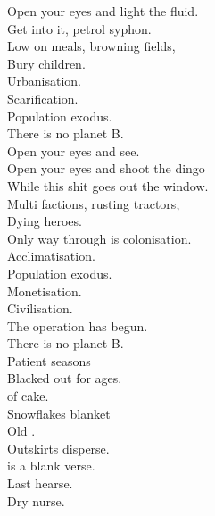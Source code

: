 
\label{album:infest-the-rats-nest}





Open your eyes and light the fluid. \\
Get into it, petrol syphon. \\
Low on meals, browning fields, \\
Bury children. \\

Urbanisation. \\
Scarification. \\
Population exodus. \\
There is no planet B. \\
Open your eyes and see. \\

Open your eyes and shoot the dingo \\
While this shit goes out the window. \\
Multi factions, rusting tractors, \\
Dying heroes. \\

Only way through is colonisation. \\
Acclimatisation. \\
Population exodus. \\
Monetisation. \\
Civilisation. \\
The operation has begun. \\
There is no planet B. \\

Patient seasons \\
Blacked out for ages. \\
 of cake. \\
Snowflakes blanket \\
Old . \\
Outskirts disperse. \\
 is a blank verse. \\
Last hearse. \\
Dry nurse. \\


